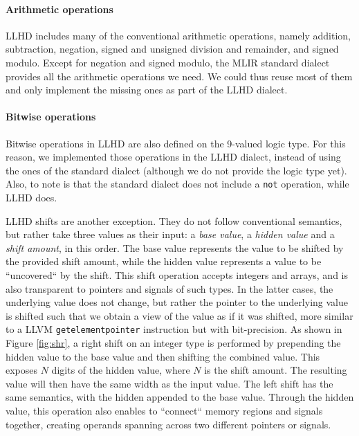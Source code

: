 \paragraph{Arithmetic operations}
LLHD includes many of the conventional arithmetic operations, namely addition, subtraction, negation, signed and unsigned division and remainder, and signed modulo. Except for negation and signed modulo, the MLIR standard dialect provides all the arithmetic operations we need. We could thus reuse most of them and only implement the missing ones as part of the LLHD dialect.

\paragraph{Bitwise operations}
Bitwise operations in LLHD are also defined on the 9-valued logic type. For this reason, we implemented those operations in the LLHD dialect, instead of using the ones of the standard dialect (although we do not provide the logic type yet). Also, to note is that the standard dialect does not include a \texttt{not} operation, while LLHD does.

LLHD shifts are another exception. They do not follow conventional semantics, but rather take three values as their input: a \textit{base value}, a \textit{hidden value} and a \textit{shift amount}, in this order. The base value represents the value to be shifted by the provided shift amount, while the hidden value represents a value to be “uncovered“ by the shift. This shift operation accepts integers and arrays, and is also transparent to pointers and signals of such types. In the latter cases, the underlying value does not change, but rather the pointer to the underlying value is shifted such that we obtain a view of the value as if it was shifted, more similar to a LLVM \texttt{getelementpointer} instruction but with bit-precision. As shown in Figure \ref{fig:shr}, a right shift on an integer type is performed by prepending the hidden value to the base value and then shifting the combined value. This exposes $N$ digits of the hidden value, where $N$ is the shift amount. The resulting value will then have the same width as the input value. The left shift has the same semantics, with the hidden appended to the base value.
Through the hidden value, this operation also enables to “connect“ memory regions and signals together, creating operands spanning across two different pointers or signals.


